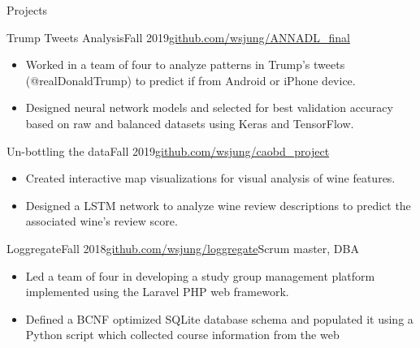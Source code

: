 \documentclass{resume} %
\begin{document}
\begin{rSection}{Projects}

\begin{rSubsection}{Trump Tweets Analysis}{Fall 2019}{\href{https://github.com/wsjung/ANNADL_final}{github.com/wsjung/ANNADL\_final}}{}
\renewcommand\labelitemi{$\cdot$}
\begin{itemize}
\setlength\itemsep{-0.25em}
\item Worked in a team of four to analyze patterns in Trump's tweets (@realDonaldTrump) to predict if from Android or iPhone device.
\item Designed neural network models and selected for best validation accuracy based on raw and balanced datasets using Keras and TensorFlow. 
\end{itemize}
\end{rSubsection}

\begin{rSubsection}{Un-bottling the data}{Fall 2019}{\href{https://github.com/wsjung/caobd_project}{github.com/wsjung/caobd\_project}}{}
\renewcommand{\labelitemi}{$\cdot$}
\begin{itemize}
\setlength\itemsep{-0.25em}
\item Created interactive map visualizations for visual analysis of wine features.
\item Designed a LSTM network to analyze wine review descriptions to predict the associated wine's review score. 
\end{itemize}
\end{rSubsection}

\begin{rSubsection}{Loggregate}{Fall 2018}{\href{https://github.com/wsjung/loggregate}{github.com/wsjung/loggregate}}{Scrum master, DBA}
\renewcommand\labelitemi{$\cdot$}
\begin{itemize}
\setlength\itemsep{-0.25em}
\item Led a team of four in developing a study group management platform implemented using the Laravel PHP web framework.
\item Defined a BCNF optimized SQLite database schema and populated it using a Python script which collected course information from the web
\end{itemize}
\end{rSubsection}


\end{rSection}
\end{document}
